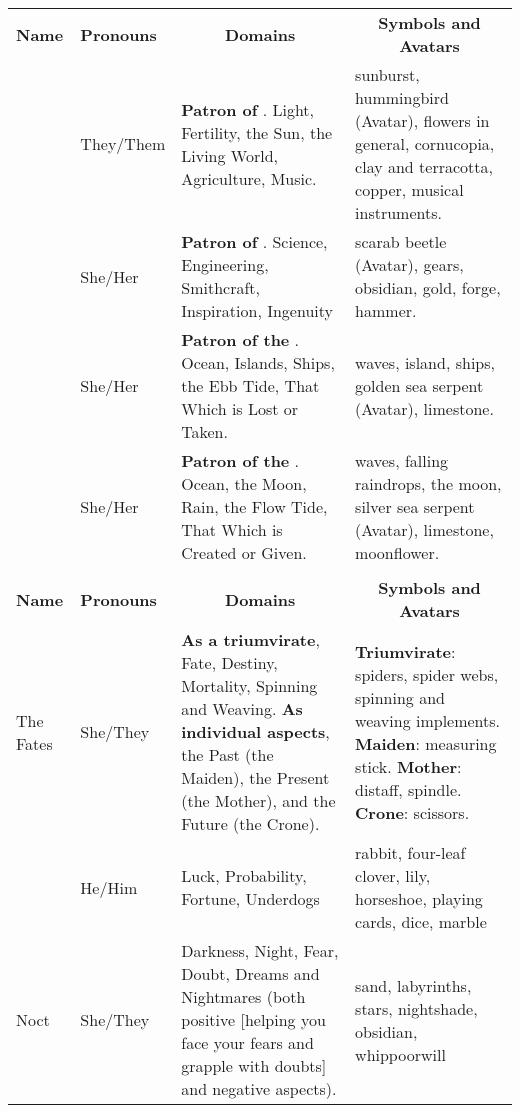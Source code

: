 \documentclass[blue]{GL2020}
\begin{document}
\begin{tabularx}{\textwidth}{|>{\centering\arraybackslash} m{1.8cm} |>{\centering\arraybackslash} m{1.5cm} | X |X |}
\hline
\multicolumn{4}{|c|}{\textbf{{\large The Patron Deities}}} \\
\hline
	\textbf{Name} & \textbf{Pronouns} & \multicolumn{1}{c|}{\textbf{Domains}} & \multicolumn{1}{c|}{\textbf{Symbols and Avatars}} \\
\hline
	\cFarmGod{} & They/Them & \textbf{Patron of \pFarm{}}. Light, Fertility, the Sun, the Living World, Agriculture, Music.  & sunburst, hummingbird (Avatar), flowers in general, cornucopia, clay and terracotta, copper, musical instruments. \\
\hline	
	\cTechGod{} & She/Her & \textbf{Patron of \pTech{}}. Science, Engineering, Smithcraft, Inspiration, Ingenuity  & scarab beetle (Avatar), gears, obsidian, gold, forge, hammer. \\
\hline	
	\cEbbFull{\full} & She/Her & \textbf{Patron of the \pShip{}}. Ocean, Islands, Ships, the Ebb Tide, That Which is Lost or Taken. & waves, island, ships, golden sea serpent (Avatar), limestone. \\
\hline	
	\cFlowFull{\full} & She/Her & \textbf{Patron of the \pShip{}}.  Ocean, the Moon, Rain, the Flow Tide, That Which is Created or Given. & waves, falling raindrops, the moon, silver sea serpent (Avatar), limestone, moonflower. \\
\hline	
\hline	
\multicolumn{4}{|c|}{\textbf{{\large The Minor Deities}}} \\
\hline	
	\textbf{Name} & \textbf{Pronouns} & \multicolumn{1}{c|}{\textbf{Domains}} & \multicolumn{1}{c|}{\textbf{Symbols and Avatars}} \\
\hline	
	The Fates & She/They & \textbf{As a triumvirate}, Fate, Destiny, Mortality, Spinning and Weaving. \textbf{As individual aspects}, the Past (the Maiden), the Present (the Mother), and the Future (the Crone). & \textbf{Triumvirate}: spiders, spider webs, spinning and weaving implements. \textbf{Maiden}: measuring stick. \textbf{Mother}: distaff, spindle. \textbf{Crone}: scissors. \\
\hline	
	\cGenesis{} & He/Him & Luck, Probability, Fortune, Underdogs & rabbit, four-leaf clover, lily, horseshoe, playing cards, dice, marble \\
\hline	
	Noct & She/They & Darkness, Night, Fear, Doubt, Dreams and Nightmares (both positive [helping you face your fears and grapple with doubts] and negative aspects). & sand, labyrinths, stars, nightshade, obsidian, whippoorwill \\

\end{tabularx}
\end{document}

